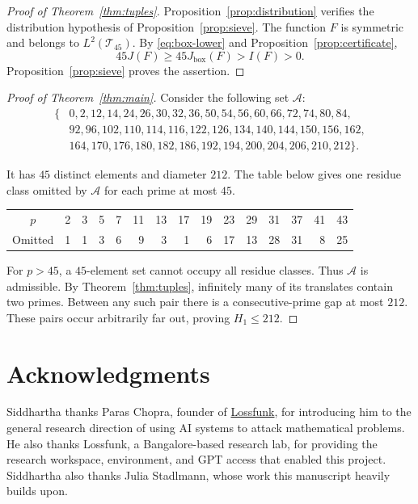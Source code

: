 \documentclass[11pt,reqno]{amsart}
\theoremstyle{definition}
\theoremstyle{remark}
\numberwithin{equation}{section}
\newcommand{\Jb}{J_{\mathrm{box}}}
\newcommand{\Tset}{\mathcal T}
\begin{document}
\begin{proof}[Proof of Theorem~\ref{thm:tuples}]
Proposition~\ref{prop:distribution} verifies the distribution hypothesis
of Proposition~\ref{prop:sieve}. The function $F$ is symmetric and belongs
to $L^2(\Tset_{45})$. By
\eqref{eq:box-lower} and Proposition~\ref{prop:certificate},
\[
 45J(F)\ge45\Jb(F)>I(F)>0.
\]
Proposition~\ref{prop:sieve} proves the assertion.
\end{proof}

\begin{proof}[Proof of Theorem~\ref{thm:main}]
Consider the following set $\mathcal A$:
\begin{equation}\label{eq:tuple}
\begin{split}
\{&0,2,12,14,24,26,30,32,36,50,54,56,60,66,72,74,80,84,\\
  &92,96,102,110,114,116,122,126,134,140,144,150,156,162,\\
  &164,170,176,180,182,186,192,194,200,204,206,210,212\}.
\end{split}
\end{equation}
\begin{samepage}
It has $45$ distinct elements and diameter $212$. The table below gives
one residue class omitted by $\mathcal A$ for each prime at most $45$.
\begin{center}
\small
\begin{tabular}{@{}c*{14}{r}@{}}
\toprule
$p$&2&3&5&7&11&13&17&19&23&29&31&37&41&43\\
Omitted&1&1&3&6&9&3&1&6&17&13&28&31&8&25\\
\bottomrule
\end{tabular}
\end{center}
\end{samepage}
For $p>45$, a $45$-element set cannot occupy all residue classes.
Thus $\mathcal A$ is admissible. By Theorem~\ref{thm:tuples}, infinitely
many of its translates contain two primes. Between any such pair there
is a consecutive-prime gap at most $212$. These pairs occur arbitrarily
far out, proving $H_1\le212$.
\end{proof}

\section*{Acknowledgments}
Siddhartha thanks Paras Chopra, founder
of \href{https://lossfunk.com}{Lossfunk}, for introducing him to the general
research direction of using
AI systems to attack mathematical problems. He also thanks Lossfunk, a
Bangalore-based research lab, for providing the research workspace,
environment, and GPT access that enabled this project. Siddhartha also
thanks Julia Stadlmann, whose work
\cite{Stadlmann26} this manuscript heavily builds upon.
\end{document}
